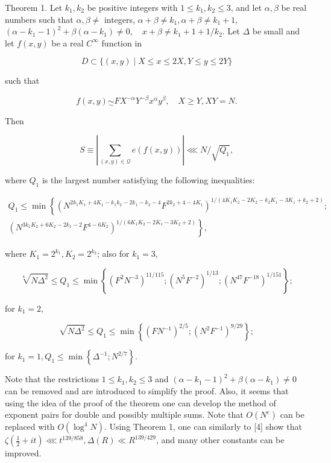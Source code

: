 \documentclass[10pt]{article}
\begin{document}
Theorem 1. Let $k_{1}, k_{2}$ be positive integers with $1 \leqslant k_{1}, k_{2} \leqslant 3$, and let $\alpha, \beta$ be real numbers such that $\alpha, \beta \neq$ integers, $\alpha+\beta \neq k_{1}, \alpha+\beta \neq k_{1}+1$, $\left(\alpha-k_{1}-1\right)^{2}+\beta\left(\alpha-k_{1}\right) \neq 0, \quad x+\beta \neq k_{1}+1+1 / k_{2}$. Let $\Delta$ be small and let $f(x, y)$ be a real $C^{\infty}$ function in

$$
D \subset\{(x, y) \mid X \leqslant x \leqslant 2 X, Y \leqslant y \leqslant 2 Y\}
$$

such that

$$
f(x, y) \underset{\sim}{\sim} F X^{-\alpha} Y^{-\beta} x^{\alpha} y^{\beta}, \quad X \geqslant Y, X Y=N .
$$

Then

$$
S \equiv\left|\sum_{(x, y) \in \mathscr{Q}} e(f(x, y))\right| \lll N / \sqrt{Q_{1}},
$$

where $Q_{1}$ is the largest number satisfying the following inequalities:

\[
\begin{array}{r}
Q_{1} \leqslant \min \left\{\left(N^{2 k_{1} K_{1}+4 K_{1}-k_{1} k_{2}-2 k_{1}-k_{2}-4} F^{2 k_{2}+4-4 K_{1}}\right)^{1 /\left(4 K_{1} K_{2}-2 K_{2}-k_{2} K_{1}-3 K_{1}+k_{2}+2\right)} ;\right.  \tag{5}\\
\left.\left(N^{3 k_{1} K_{2}+6 K_{2}-2 k_{1}-2} F^{4-6 K_{2}}\right)^{1 /\left(6 K_{1} K_{2}-2 K_{1}-3 K_{2}+2\right)}\right\},
\end{array}
\]

where $K_{1}=2^{k_{1}}, K_{2}=2^{k_{2}}$; also for $k_{1}=3$,

$$
\sqrt[4]{N \Delta^{2}} \leqslant Q_{1} \leqslant \min \left\{\left(F^{2} N^{-3}\right)^{11 / 115} ;\left(N^{5} F^{-2}\right)^{1 / 13} ;\left(N^{47} F^{-18}\right)^{1 / 151}\right\} ;
$$

for $k_{1}=2$,

$$
\sqrt{N \Delta^{2}} \leqslant Q_{1} \leqslant \min \left\{\left(F N^{-1}\right)^{2 / 5} ;\left(N^{2} F^{-1}\right)^{9 / 29}\right\} ;
$$

for $k_{1}=1, Q_{1} \leqslant \min \left\{\Delta^{-1} ; N^{2 / 7}\right\}$.

Note that the restrictions $1 \leqslant k_{1}, k_{2} \leqslant 3$ and $\left(\alpha-k_{1}-1\right)^{2}+\beta\left(\alpha-k_{1}\right) \neq 0$ can be removed and are introduced to simplify the proof. Also, it seems that using the idea of the proof of the theorem one can develop the method of exponent pairs for double and possibly multiple sums. Note that $O\left(N^{e}\right)$ can be replaced with $O\left(\log ^{4} N\right)$. Using Theorem 1, one can similarly to [4] show that $\zeta\left(\frac{1}{2}+i t\right) \lll t^{139 / 858}, \Delta(R) \ll R^{139 / 429}$, and many other constants can be improved.
\end{document}
